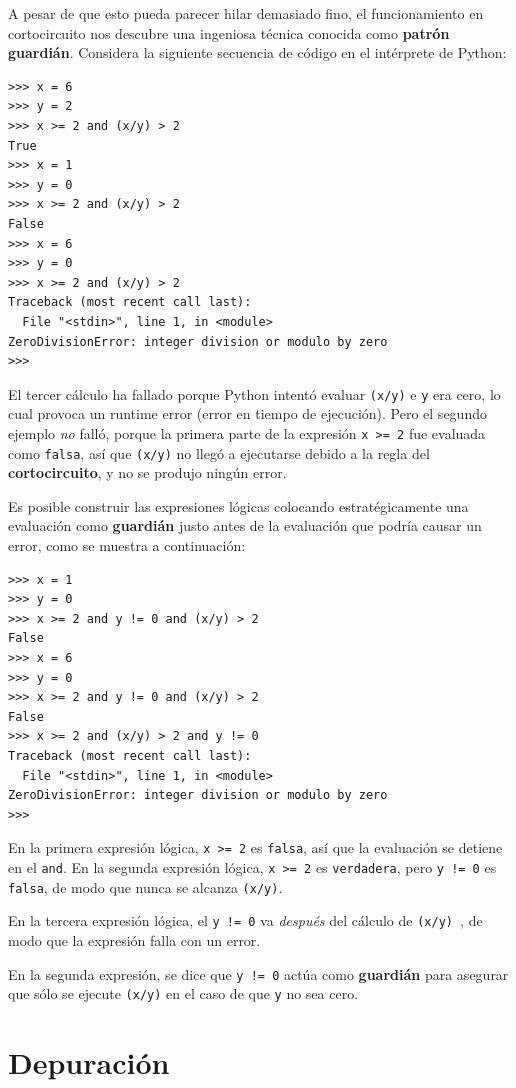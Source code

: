A pesar de que esto pueda parecer hilar demasiado fino, el funcionamiento
en cortocircuito nos descubre una ingeniosa técnica conocida como {\bf patrón guardián}.
Considera la siguiente secuencia de código en el intérprete de Python:

\beforeverb
\begin{verbatim}
>>> x = 6 
>>> y = 2
>>> x >= 2 and (x/y) > 2
True
>>> x = 1 
>>> y = 0
>>> x >= 2 and (x/y) > 2
False
>>> x = 6
>>> y = 0
>>> x >= 2 and (x/y) > 2
Traceback (most recent call last):
  File "<stdin>", line 1, in <module>
ZeroDivisionError: integer division or modulo by zero
>>> 
\end{verbatim}
\afterverb
%
El tercer cálculo ha fallado porque Python intentó evaluar {\tt (x/y)}
e {\tt y} era cero, lo cual provoca un runtime error (error en tiempo de ejecución). Pero el segundo
ejemplo \emph{no} falló, porque la primera parte de la expresión {\tt x >= 2}
fue evaluada como {\tt falsa}, así que {\tt (x/y)} no llegó a ejecutarse
debido a la regla del {\bf cortocircuito}, y no se produjo ningún error.

Es posible construir las expresiones lógicas colocando estratégicamente una
evaluación como {\bf guardián} justo antes de la evaluación que podría causar un error,
como se muestra a continuación:

\beforeverb
\begin{verbatim}
>>> x = 1
>>> y = 0
>>> x >= 2 and y != 0 and (x/y) > 2
False
>>> x = 6 
>>> y = 0
>>> x >= 2 and y != 0 and (x/y) > 2
False
>>> x >= 2 and (x/y) > 2 and y != 0
Traceback (most recent call last):
  File "<stdin>", line 1, in <module>
ZeroDivisionError: integer division or modulo by zero
>>>
\end{verbatim}
\afterverb
%
En la primera expresión lógica, {\tt x >= 2} es {\tt falsa}, así que la evaluación
se detiene en el {\tt and}. En la segunda expresión lógica, {\tt x >= 2} es {\tt verdadera},
pero {\tt y != 0} es {\tt falsa}, de modo que nunca se alcanza {\tt (x/y)}.

En la tercera expresión lógica, el {\tt y != 0} va \emph{después} del
cálculo de {\tt (x/y) }, de modo que la expresión falla con un error.

En la segunda expresión, se dice que {\tt y != 0} actúa como {\bf guardián}
para asegurar que sólo se ejecute {\tt (x/y)} en el caso de que {\tt y} no sea cero.


\section{Depuración}
\label{whitespace}


